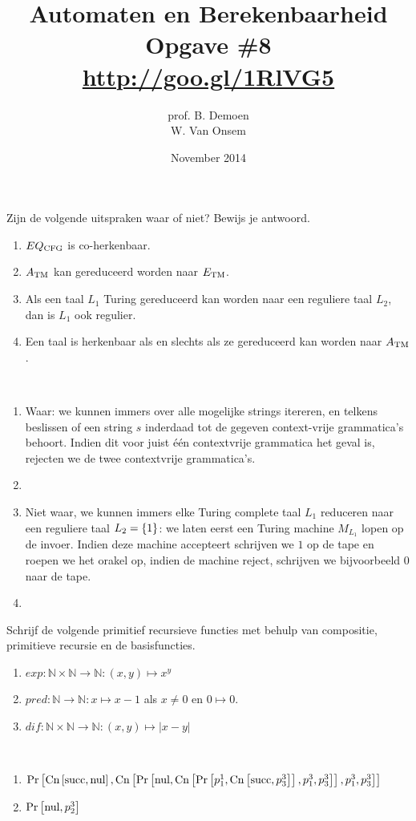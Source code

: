 \documentclass[a4paper]{article}
\title{Automaten en Berekenbaarheid\\Opgave \#8\\\url{http://goo.gl/1RlVG5}}
\author{prof. B. Demoen\\W. Van Onsem}
\date{November 2014}
\newcommand{\prnul}[0]{\ensuremath{\mbox{nul}}}
\newcommand{\prsucc}[0]{\ensuremath{\mbox{succ}}}
\newcommand{\prp}[2]{\ensuremath{p_{#2}^{#1}}}
\newcommand{\prcn}[2]{\funmf{Cn}{#1,#2}}
\newcommand{\prpr}[2]{\funmf{Pr}{#1,#2}}
\newcommand{\N}{\mathbb{N}}
\begin{document}
\maketitle

\begin{question}
Zijn de volgende uitspraken waar of niet? Bewijs je antwoord.
\begin{enumerate}
  \item $EQ_{\rm CFG}$ is co-herkenbaar.
  \item $A_{\rm TM}$ kan gereduceerd worden naar $E_{\rm TM}$.
  \item Als een taal $L_1$ Turing gereduceerd kan worden naar een reguliere taal $L_2$, dan is $L_1$ ook regulier.
  \item Een taal is herkenbaar als en slechts als ze gereduceerd kan worden naar $A_{\rm TM}$.
\end{enumerate}
\begin{answer}~~
\begin{enumerate}
 \item Waar: we kunnen immers over alle mogelijke strings itereren, en telkens beslissen of een string $s$ inderdaad tot de gegeven context-vrije grammatica's behoort. Indien dit voor juist \'e\'en contextvrije grammatica het geval is, rejecten we de twee contextvrije grammatica's.
 \item 
 \item Niet waar, we kunnen immers elke Turing complete taal $L_1$ reduceren naar een reguliere taal $L_2=\left\{ 1 \right\}$: we laten eerst een Turing machine $M_{L_1}$ lopen op de invoer. Indien deze machine accepteert schrijven we $1$ op de tape en roepen we het orakel op, indien de machine reject, schrijven we bijvoorbeeld $0$ naar de tape.
 \item 
\end{enumerate}
\end{answer}
\end{question}

\begin{question}
Schrijf de volgende primitief recursieve functies met behulp van compositie, primitieve recursie en de basisfuncties.
\begin{enumerate}
  \item $exp : \N \times \N \to \N : (x,y) \mapsto x^y$
  \item $pred : \N \to \N : x \mapsto x - 1$ als $x \neq 0$ en $0 \mapsto 0$.
  \item $dif : \N \times \N \to \N : (x,y) \mapsto | x - y |$
\end{enumerate}
\begin{answer}~~
\begin{enumerate}
 \item $\prpr{\prcn{\prsucc}{\prnul}}{\prcn{\prpr{\prnul}{\prcn{\prpr{\prp{1}{1}}{\prcn{\prsucc}{\prp{3}{3}}}}{\prp{3}{1},\prp{3}{3}}}}{\prp{3}{1},\prp{3}{3}}}$
 \item $\prpr{\prnul}{\prp{3}{2}}$
\end{enumerate}
\end{answer}
\end{question}
\end{document}
